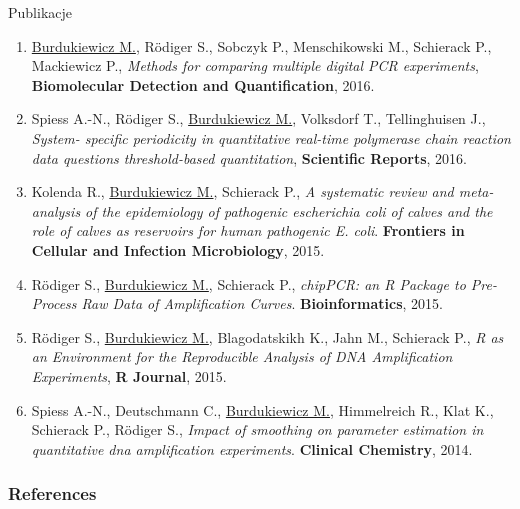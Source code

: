 \documentclass{beamer}\usepackage[]{graphicx}\usepackage[]{color}
\begin{document}
\begin{frame}[allowframebreaks]{Publikacje}
\begin{enumerate}
\item \underline{Burdukiewicz M.}, R\"{o}diger S., Sobczyk P., Menschikowski 
M., Schierack P.,
Mackiewicz P., \textit{Methods for comparing multiple digital PCR experiments}, 
\textbf{Biomolecular
Detection and Quantification}, 2016.

\item Spiess A.-N., R\"{o}diger S., \underline{Burdukiewicz M.}, Volksdorf T., 
Tellinghuisen J., \textit{System-
specific periodicity in quantitative real-time polymerase chain reaction data 
questions
threshold-based quantitation}, \textbf{Scientific Reports}, 2016.

\item Kolenda R., \underline{Burdukiewicz M.}, Schierack P., \textit{A 
systematic review and meta-analysis of the epidemiology of pathogenic 
escherichia coli of calves and the role of calves as reservoirs for human 
pathogenic E. coli}. \textbf{Frontiers in Cellular and Infection Microbiology}, 
2015.

\item R\"{o}diger S., \underline{Burdukiewicz M.}, Schierack P., 
\textit{chipPCR: an R Package to Pre-Process Raw Data of Amplification Curves}. 
\textbf{Bioinformatics}, 2015.

\item R\"{o}diger S., \underline{Burdukiewicz M.}, Blagodatskikh K., Jahn M., 
Schierack P., 
\textit{R as an
Environment for the Reproducible Analysis of DNA Amplification Experiments}, 
\textbf{R Journal}, 2015.

\item Spiess A.-N., Deutschmann C., \underline{Burdukiewicz M.}, Himmelreich 
R., 
Klat K., Schierack P., R\"{o}diger S., \textit{Impact of smoothing on parameter 
estimation in quantitative dna amplification experiments}. \textbf{Clinical 
Chemistry}, 2014.

\end{enumerate}
\end{frame}


\begin{frame}[allowframebreaks]
        \frametitle{References}
  
  
\end{frame}  
\end{document}
